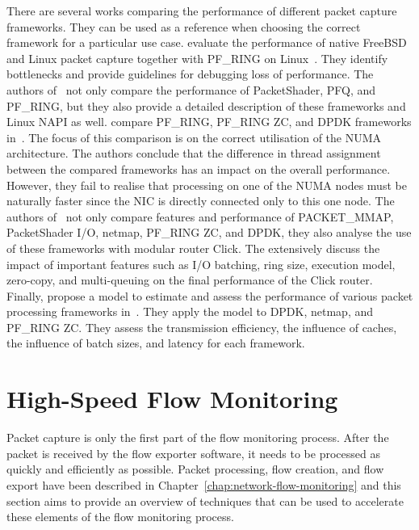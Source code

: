 There are several works comparing the performance of different packet capture frameworks. They can be used as a reference when choosing the correct framework for a particular use case. \citeauthor{Braun-2010-Comparing} evaluate the performance of native FreeBSD and Linux packet capture together with PF\_RING on Linux~\cite{Braun-2010-Comparing}. They identify bottlenecks and provide guidelines for debugging loss of performance. The authors of~\cite{Garcia-Dorado-2013-High} not only compare the performance of PacketShader, PFQ, and PF\_RING, but they also provide a detailed description of these frameworks and Linux NAPI as well. \citeauthor{Wang-2016-Comparison} compare PF\_RING, PF\_RING ZC, and DPDK frameworks in~\cite{Wang-2016-Comparison}. The focus of this comparison is on the correct utilisation of the NUMA architecture. The authors conclude that the difference in thread assignment between the compared frameworks has an impact on the overall performance. However, they fail to realise that processing on one of the NUMA nodes must be naturally faster since the NIC is directly connected only to this one node. The authors of~\cite{Barbette-2015-Fast} not only compare features and performance of PACKET\_MMAP, PacketShader I/O, netmap, PF\_RING ZC, and DPDK, they also analyse the use of these frameworks with modular router Click. The extensively discuss the impact of important features such as I/O batching, ring size, execution model, zero-copy, and multi-queuing on the final performance of the Click router. Finally, \citeauthor{Gallenmueller-2015-Comparison} propose a model to estimate and assess the performance of various packet processing frameworks in~\cite{Gallenmueller-2015-Comparison}. They apply the model to DPDK, netmap, and PF\_RING ZC. They assess the transmission efficiency, the influence of caches, the influence of batch sizes, and latency for each framework.



\section{High-Speed Flow Monitoring}

Packet capture is only the first part of the flow monitoring process. After the packet is received by the flow exporter software, it needs to be processed as quickly and efficiently as possible. Packet processing, flow creation, and flow export have been described in Chapter~\ref{chap:network-flow-monitoring} and this section aims to provide an overview of techniques that can be used to accelerate these elements of the flow monitoring process. 

